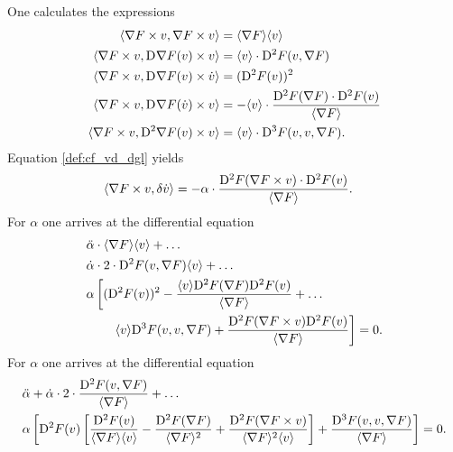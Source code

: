 One calculates the expressions
\begin{subequations}
    \begin{align}
        \langle  \nabla F  \times v ,  \nabla F  \times v  \rangle  &=
        \langle  \nabla F   \rangle \langle  v  \rangle\\
        \langle  \nabla F  \times v ,  \mathrm{D}^{  } \nabla F  ( v ) \times v  \rangle  &=
        \langle  v  \rangle \cdot \mathrm{D}^{ 2 } F ( v, \nabla F  )\\
        \langle  \nabla F  \times v ,  \mathrm{D}^{  } \nabla F  ( v ) \times \dot{ v }  \rangle  &=
        ( \mathrm{D}^{ 2 } F ( v ) )^2\\
        \langle  \nabla F  \times v ,  \mathrm{D}^{  } \nabla F  ( \dot{ v } ) \times v  \rangle  &=
        -  \langle  v  \rangle \cdot \frac{ \mathrm{D}^{ 2 } F ( \nabla F  ) \cdot \mathrm{D}^{ 2 } F ( v ) }{ \langle  \nabla F   \rangle }\\
        \langle  \nabla F  \times v ,  \mathrm{D}^{ 2 } \nabla F  ( v ) \times v  \rangle  &=
        \langle  v  \rangle \cdot \mathrm{D}^{ 3 } F ( v, v, \nabla F  ) .
    \end{align}
\end{subequations}
Equation \eqref{def:cf_vd_dgl} yields
\begin{align}
    \langle  \nabla F  \times v ,  \delta \dot{ v }  \rangle  &=
    -\alpha \cdot \frac{ \mathrm{D}^{ 2 } F ( \nabla F  \times v ) \cdot \mathrm{D}^{ 2 } F ( v ) }{ \langle  \nabla F   \rangle } .
\end{align}
For $ \alpha $ one arrives at the differential equation
\begin{align}
    &\ddot{ \alpha } \cdot \langle  \nabla F   \rangle \langle  v  \rangle  +  \dots\nonumber\\
    &\dot{ \alpha } \cdot 2 \cdot \mathrm{D}^{ 2 } F ( v, \nabla F  ) \langle  v  \rangle  +  \dots\nonumber\\
    &\alpha \left[ ( \mathrm{D}^{ 2 } F ( v ) )^2  -
    \frac{ \langle  v  \rangle \mathrm{D}^{ 2 } F ( \nabla F  ) \mathrm{D}^{ 2 } F ( v ) }{ \langle  \nabla F   \rangle }  +  \dots\right.\nonumber\\
    &\qquad\left.\langle  v  \rangle \mathrm{D}^{ 3 } F ( v, v, \nabla F  )  +
    \frac{ \mathrm{D}^{ 2 } F ( \nabla F  \times v ) \mathrm{D}^{ 2 } F ( v ) }{ \langle  \nabla F   \rangle } \right]  =  0 .
\end{align}
For $ \alpha $ one arrives at the differential equation
\begin{align}
    &\ddot{ \alpha }  +
    \dot{ \alpha } \cdot 2 \cdot \frac{ \mathrm{D}^{ 2 } F ( v, \nabla F  ) }
    { \langle  \nabla F   \rangle }  +  \dots\nonumber\\
    &\alpha \left[ \mathrm{D}^{ 2 } F ( v ) \left[ \frac{ \mathrm{D}^{ 2 } F ( v ) }{ \langle  \nabla F   \rangle \langle  v  \rangle }  -
    \frac{ \mathrm{D}^{ 2 } F ( \nabla F  ) }{ \langle  \nabla F   \rangle^2 }  +
    \frac{ \mathrm{D}^{ 2 } F ( \nabla F  \times v ) }{ \langle  \nabla F   \rangle^2 \langle  v  \rangle } \right]  +
    \frac{ \mathrm{D}^{ 3 } F ( v, v, \nabla F  ) }{ \langle  \nabla F   \rangle } \right]  =  0 .
\end{align}


